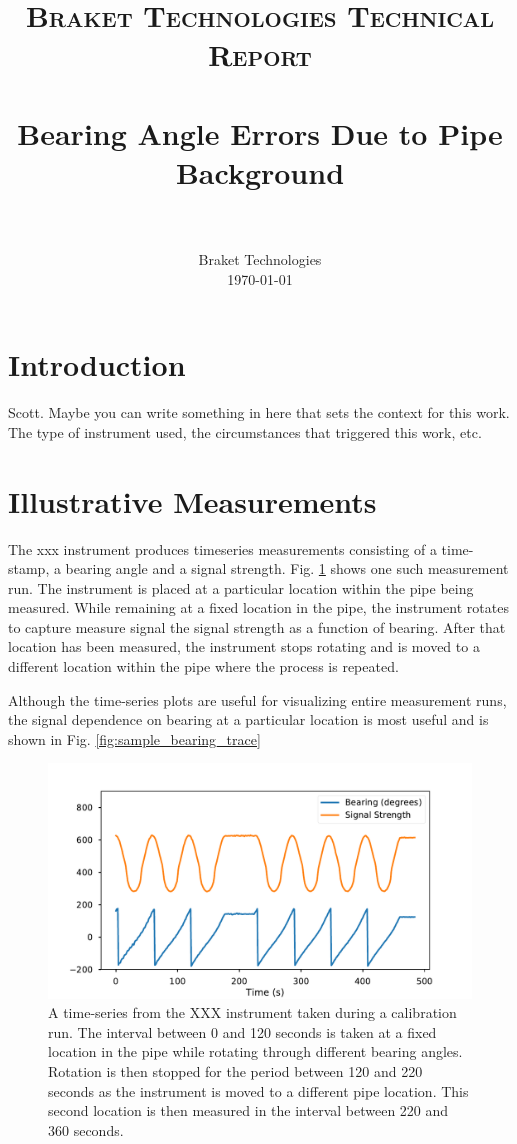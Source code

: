 \documentclass[paper=a4, fontsize=11pt]{scrartcl}
\title{
		\usefont{OT1}{bch}{b}{n}
		\normalfont \normalsize \textsc{Braket Technologies Technical Report} \\ [25pt]
		\horrule{0.5pt} \\[0.4cm]
		\huge Bearing Angle Errors Due to Pipe Background \\
		\horrule{2pt} \\[0.5cm]
}
\author{
		\normalfont 								\normalsize
        Braket Technologies\\[-3pt]		\normalsize
        \today
}
\date{}
\numberwithin{equation}{section}		%
\numberwithin{figure}{section}			%
\numberwithin{table}{section}				%
\begin{document}
\maketitle
\section{Introduction}
Scott.  Maybe you can write something in here that sets the context for this work.  The type of instrument used, the circumstances that triggered this work, etc.

\section{Illustrative Measurements}
The xxx instrument produces timeseries measurements consisting of a time-stamp, a bearing angle and a signal strength.  Fig. \ref{fig:sample_time_trace} shows one such measurement run.  The instrument is placed at a particular location within the pipe being measured.  While remaining at a fixed location in the pipe, the instrument rotates to capture measure signal the signal strength as a function of bearing.  After that location has been measured, the instrument stops rotating and is moved to a different location within the pipe where the process is repeated.

\par Although the time-series plots are useful for visualizing entire measurement runs, the signal dependence on bearing at a particular location is most useful and is shown in Fig. \ref{fig:sample_bearing_trace}


\begin{figure}[h!]
  \caption{A time-series from the XXX instrument taken during a calibration run. The interval between 0 and 120 seconds is taken at a fixed location in the pipe while rotating through different bearing angles.  Rotation is then stopped for the period between 120 and 220 seconds as the instrument is moved to a different pipe location.  This second location is then measured in the interval between 220 and 360 seconds.}
  \label{fig:sample_time_trace}
  \centering
  \includegraphics[width=1.0\textwidth]{figures/sample_time_trace.pdf}
\end{figure}
\end{document}
